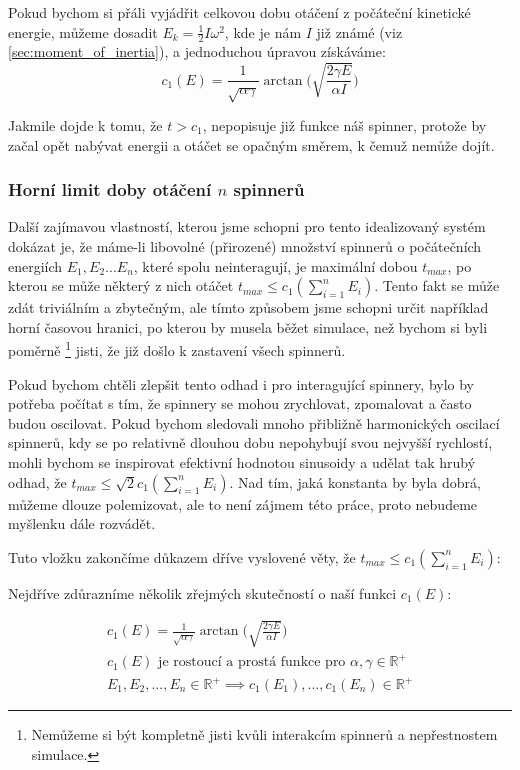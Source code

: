 Pokud bychom si přáli vyjádřit celkovou dobu otáčení z počáteční kinetické energie, můžeme dosadit $E_k = \frac{1}{2}I\omega^2$, kde je nám $I$ již známé (viz \autoref{sec:moment_of_inertia}), a jednoduchou úpravou získáváme:
\begin{equation}
    \label{eq:runtime_from_ene}
    c_1(E) = \frac{1}{\sqrt{\alpha\gamma}} \arctan{ \bigg( \sqrt{\frac{2 \gamma E}{\alpha I}} \bigg)}
\end{equation}

Jakmile dojde k tomu, že $t > c_1$, nepopisuje již funkce náš spinner, protože by začal opět nabývat energii a otáčet se opačným směrem, k čemuž nemůže dojít.

\clearpage

\subsubsection{Horní limit doby otáčení $n$ spinnerů}

Další zajímavou vlastností, kterou jsme schopni pro tento idealizovaný systém dokázat je, že máme-li libovolné (přirozené) množství spinnerů o počátečních energiích $E_1, E_2 ... E_n$, které spolu neinteragují, je maximální dobou $t_{max}$, po kterou se může některý z nich otáčet $t_{max} \leq c_1(\sum_{i=1}^n E_i)$. Tento fakt se může zdát triviálním a zbytečným, ale tímto způsobem jsme schopni určit například horní časovou hranici, po kterou by musela běžet simulace, než bychom si byli poměrně \footnote{Nemůžeme si být kompletně jisti kvůli interakcím spinnerů a nepřestnostem simulace.} jisti, že již došlo k zastavení všech spinnerů.

Pokud bychom chtěli zlepšit tento odhad i pro interagující spinnery, bylo by potřeba počítat s tím, že spinnery se mohou zrychlovat, zpomalovat a často budou oscilovat. Pokud bychom sledovali mnoho přibližně harmonických oscilací spinnerů, kdy se po relativně dlouhou dobu nepohybují svou nejvyšší rychlostí, mohli bychom se inspirovat efektivní hodnotou sinusoidy a udělat tak hrubý odhad, že $t_{max} \leq \sqrt{2} c_1(\sum_{i=1}^n E_i)$. Nad tím, jaká konstanta by byla dobrá, můžeme dlouze polemizovat, ale to není zájmem této práce, proto nebudeme myšlenku dále rozvádět.

Tuto vložku zakončíme důkazem dříve vyslovené věty, že $t_{max} \leq c_1(\sum_{i=1}^n E_i)$:

Nejdříve zdůrazníme několik zřejmých skutečností o naší funkci $c_1(E)$:

\begin{equation}
    \label{eq:max_runtime_proof_p1}
    \begin{gathered}
        c_1(E) = \frac{1}{\sqrt{\alpha\gamma}} \arctan{ \bigg( \sqrt{\frac{2 \gamma E}{\alpha I}} \bigg)} \\
        c_1(E) \text{ je rostoucí a prostá funkce pro } \alpha, \gamma \in \mathbb{R}^+ \\
        E_1, E_2, ..., E_n \in \mathbb{R}^+ \implies c_1(E_1), ..., c_1(E_n) \in \mathbb{R}^+
    \end{gathered}
\end{equation}

